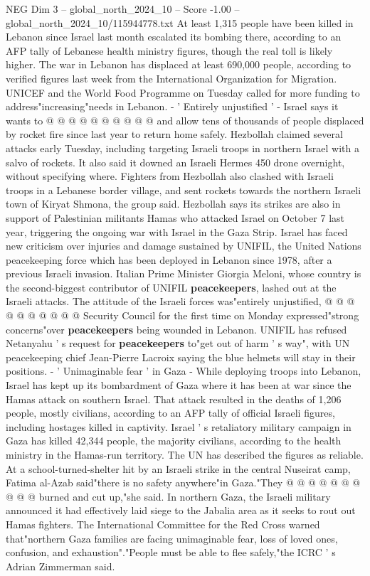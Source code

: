 \begin{textsample}{NEG Dim 3 – global\_north\_2024\_10 – Score -1.00 – global\_north\_2024\_10/115944778.txt}
At least 1,315 people have been killed in Lebanon since Israel last month escalated its bombing there, according to an AFP tally of Lebanese health ministry figures, though the real toll is likely higher.
The war in Lebanon has displaced at least 690,000 people, according to verified figures last week from the International Organization for Migration.
UNICEF and the World Food Programme on Tuesday called for more funding to address"increasing"needs in Lebanon. - ' Entirely unjustified ' - Israel says it wants to @ @ @ @ @ @ @ @ @ @ and allow tens of thousands of people displaced by rocket fire since last year to return home safely.
Hezbollah claimed several attacks early Tuesday, including targeting Israeli troops in northern Israel with a salvo of rockets.
It also said it downed an Israeli Hermes 450 drone overnight, without specifying where.
Fighters from Hezbollah also clashed with Israeli troops in a Lebanese border village, and sent rockets towards the northern Israeli town of Kiryat Shmona, the group said.
Hezbollah says its strikes are also in support of Palestinian militants Hamas who attacked Israel on October 7 last year, triggering the ongoing war with Israel in the Gaza Strip.
Israel has faced new criticism over injuries and damage sustained by UNIFIL, the United Nations peacekeeping force which has been deployed in Lebanon since 1978, after a previous Israeli invasion.
Italian Prime Minister Giorgia Meloni, whose country is the second-biggest contributor of UNIFIL \textbf{peacekeepers}, lashed out at the Israeli attacks.
The attitude of the Israeli forces was"entirely unjustified, @ @ @ @ @ @ @ @ @ @ Security Council for the first time on Monday expressed"strong concerns"over \textbf{peacekeepers} being wounded in Lebanon.
UNIFIL has refused Netanyahu ' s request for \textbf{peacekeepers} to"get out of harm ' s way", with UN peacekeeping chief Jean-Pierre Lacroix saying the blue helmets will stay in their positions. - ' Unimaginable fear ' in Gaza - While deploying troops into Lebanon, Israel has kept up its bombardment of Gaza where it has been at war since the Hamas attack on southern Israel.
That attack resulted in the deaths of 1,206 people, mostly civilians, according to an AFP tally of official Israeli figures, including hostages killed in captivity.
Israel ' s retaliatory military campaign in Gaza has killed 42,344 people, the majority civilians, according to the health ministry in the Hamas-run territory.
The UN has described the figures as reliable.
At a school-turned-shelter hit by an Israeli strike in the central Nuseirat camp, Fatima al-Azab said"there is no safety anywhere"in Gaza."They @ @ @ @ @ @ @ @ @ @ burned and cut up,"she said.
In northern Gaza, the Israeli military announced it had effectively laid siege to the Jabalia area as it seeks to rout out Hamas fighters.
The International Committee for the Red Cross warned that"northern Gaza families are facing unimaginable fear, loss of loved ones, confusion, and exhaustion"."People must be able to flee safely,"the ICRC ' s Adrian Zimmerman said.

\end{textsample}
